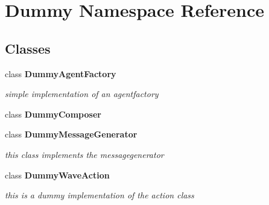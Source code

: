 \section{Dummy Namespace Reference}
\label{namespaceDummy}




\subsection*{Classes}
\begin{CompactItemize}
\item 
class {\bf DummyAgentFactory}
\begin{CompactList}\small\item\em simple implementation of an agentfactory \item\end{CompactList}\item 
class {\bf DummyComposer}
\item 
class {\bf DummyMessageGenerator}
\begin{CompactList}\small\item\em this class implements the messagegenerator \item\end{CompactList}\item 
class {\bf DummyWaveAction}
\begin{CompactList}\small\item\em this is a dummy implementation of the action class \item\end{CompactList}\end{CompactItemize}
